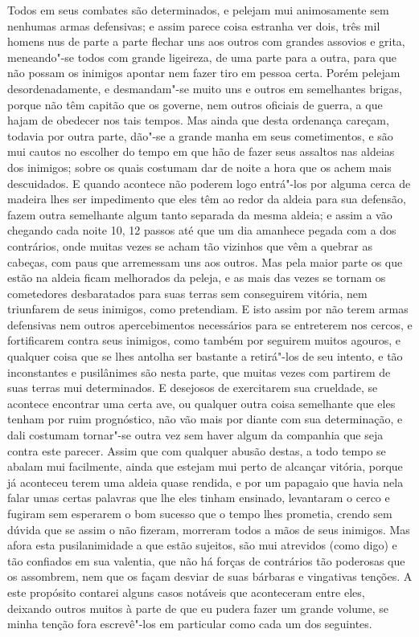 Todos em seus combates são determinados, e pelejam mui animosamente sem
nenhumas armas defensivas; e assim parece coisa estranha ver dois, três
mil homens nus de parte a parte flechar uns aos outros com grandes
assovios e grita, meneando"-se  todos com grande ligeireza, de uma parte
para a outra, para que não possam os inimigos apontar nem fazer tiro em
pessoa certa. Porém pelejam desordenadamente, e desmandam"-se muito uns
e outros em semelhantes brigas, porque não têm capitão que os governe,
nem outros oficiais de guerra, a que hajam de obedecer nos tais tempos.
Mas ainda que desta ordenança careçam, todavia por outra parte, dão"-se
a grande manha em seus cometimentos, e são mui cautos no escolher do
tempo em que hão de fazer seus assaltos nas aldeias dos inimigos; sobre os
quais costumam dar de noite a hora que os achem mais descuidados. E
quando acontece não poderem logo entrá"-los por alguma cerca de madeira
lhes ser impedimento que eles têm ao redor da aldeia para sua defensão,			%
fazem outra semelhante algum tanto separada da mesma aldeia; e assim a
vão chegando cada noite 10, 12 passos até que um dia amanhece pegada
com a dos contrários, onde muitas vezes se acham tão vizinhos que vêm a
quebrar as cabeças, com paus que arremessam uns aos outros. Mas pela
maior parte os que estão na aldeia ficam melhorados da peleja, e as mais
das vezes se tornam os cometedores desbaratados para suas terras sem
conseguirem vitória, nem triunfarem de seus inimigos, como pretendiam. E
isto assim por não terem armas defensivas nem outros apercebimentos
necessários para se entreterem nos cercos, e fortificarem contra seus
inimigos, como também por seguirem muitos agouros, e qualquer coisa que se lhes
antolha
ser bastante a retirá"-los de seu intento, e tão
inconstantes e pusilânimes são nesta parte, que muitas vezes com
partirem de suas terras mui determinados. E desejosos de exercitarem
sua crueldade, se acontece encontrar uma certa ave, ou qualquer outra
coisa semelhante que eles tenham por ruim prognóstico, não vão mais por			%
diante com sua determinação, e dali costumam tornar"-se outra vez sem
haver algum da companhia que seja contra este parecer. Assim que com
qualquer abusão destas, a todo tempo se abalam mui facilmente, ainda que
estejam mui perto de alcançar vitória, porque já aconteceu terem uma
aldeia quase rendida, e por um papagaio que havia nela falar umas certas		%
palavras que lhe eles tinham ensinado, levantaram o cerco e fugiram sem
esperarem o bom sucesso que o tempo lhes prometia, crendo sem dúvida
que se assim o não fizeram, morreram todos a mãos de seus inimigos. Mas
afora esta pusilanimidade a que estão sujeitos, são mui atrevidos (como
digo) e tão confiados em sua valentia, que não há forças de contrários
tão poderosas que os assombrem, nem que os façam desviar de suas
bárbaras e vingativas tenções. A este propósito contarei alguns casos
notáveis que aconteceram entre eles, deixando outros muitos à parte de
que eu pudera fazer um grande volume, se minha tenção fora escrevê"-los
em particular como cada um dos seguintes.

